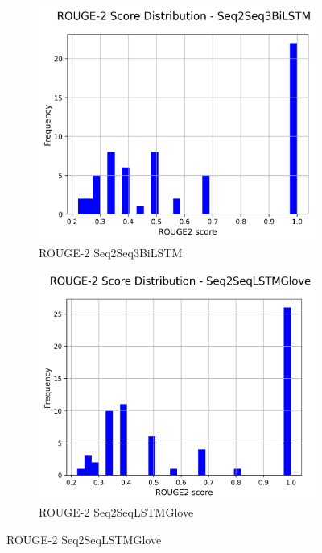 \begin{figure}[H]
    \hfill
    \begin{subfigure}{0.24\textwidth}
        \centering
        \includegraphics[width=\textwidth]{media/Seq2Seq3BiLSTM_rouge2_scores.png}
        \caption{ROUGE-2 Seq2Seq3BiLSTM}
    \end{subfigure}
    \hfill
    \begin{subfigure}{0.24\textwidth}
        \centering
        \includegraphics[width=\textwidth]{media/Seq2SeqLSTMGlove_rouge2_scores.png}
        \caption{ROUGE-2 Seq2SeqLSTMGlove}
    \end{subfigure}

\end{figure}
